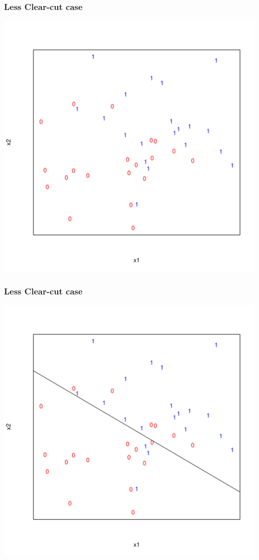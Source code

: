 \documentclass[xcolor=x11names,compress]{beamer}\usepackage[]{graphicx}\usepackage[]{color}
\newenvironment{knitrout}{}{} %
\begin{document}
\begin{frame}
  \frametitle{Less Clear-cut case}
\begin{knitrout}\tiny
{}\color{fgcolor}

{\centering \includegraphics[width=.6\linewidth]{figure/beamer-predmod4-1} 

}



\end{knitrout}
\end{frame}

\begin{frame}
  \frametitle{Less Clear-cut case}
\begin{knitrout}\tiny
{}\color{fgcolor}

{\centering \includegraphics[width=.6\linewidth]{figure/beamer-predmod5-1} 

}



\end{knitrout}
\end{frame}
\end{document}
